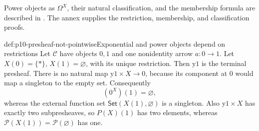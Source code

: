 Power objects as \(\Omega^X\), their natural classification, and
the membership formula are described in
\cite[\S1, pp.~7--8, Exercise~4]{MoerdijkVanOosten2007Topos}.
The annex supplies the restriction, membership, and classification
proofs.

\begin{hbexample}{def:p10-presheaf-not-pointwise}{Exponential and power objects depend on restrictions}
Let \(\mathcal C\) have objects \(0,1\) and one nonidentity arrow
\(a:0\to1\).
Let \(X(0)=\{*\}\), \(X(1)=\varnothing\), with its unique restriction.
Then \(\mathrm y1\) is the terminal presheaf.
There is no natural map \(\mathrm y1\times X\to0\), because its
component at \(0\) would map a singleton to the empty set.
Consequently
\[
                     (0^X)(1)=\varnothing,
\]
whereas the external function set
\(\mathsf{Set}(X(1),\varnothing)\) is a singleton.
Also \(\mathrm y1\times X\) has exactly two subpresheaves,
so \(P(X)(1)\) has two elements, whereas
\(\mathcal P(X(1))=\mathcal P(\varnothing)\) has one.
\end{hbexample}
